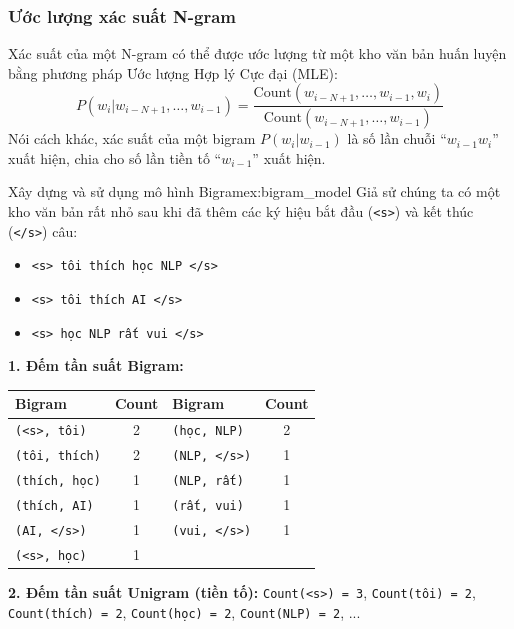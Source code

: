 \subsubsection{Ước lượng xác suất N-gram}
Xác suất của một N-gram có thể được ước lượng từ một kho văn bản huấn luyện bằng phương pháp Ước lượng Hợp lý Cực đại (MLE):
$$ P(w_i | w_{i-N+1}, \dots, w_{i-1}) = \frac{\text{Count}(w_{i-N+1}, \dots, w_{i-1}, w_i)}{\text{Count}(w_{i-N+1}, \dots, w_{i-1})} $$
Nói cách khác, xác suất của một bigram $P(w_i|w_{i-1})$ là số lần chuỗi “$w_{i-1} w_i$” xuất hiện, chia cho số lần tiền tố “$w_{i-1}$” xuất hiện.

\begin{example}{Xây dựng và sử dụng mô hình Bigram}{ex:bigram_model}
    Giả sử chúng ta có một kho văn bản rất nhỏ sau khi đã thêm các ký hiệu bắt đầu (\texttt{<s>}) và kết thúc (\texttt{</s>}) câu:
    \begin{itemize}
        \item \texttt{<s> tôi thích học NLP </s>}
        \item \texttt{<s> tôi thích AI </s>}
        \item \texttt{<s> học NLP rất vui </s>}
    \end{itemize}

    \textbf{1. Đếm tần suất Bigram:}
    \begin{center}
    \begin{tabular}{|l|c||l|c|}
        \hline
        \textbf{Bigram} & \textbf{Count} & \textbf{Bigram} & \textbf{Count} \\
        \hline
        \texttt{(<s>, tôi)} & 2 & \texttt{(học, NLP)} & 2 \\
        \texttt{(tôi, thích)} & 2 & \texttt{(NLP, </s>)} & 1 \\
        \texttt{(thích, học)} & 1 & \texttt{(NLP, rất)} & 1 \\
        \texttt{(thích, AI)} & 1 & \texttt{(rất, vui)} & 1 \\
        \texttt{(AI, </s>)} & 1 & \texttt{(vui, </s>)} & 1 \\
        \texttt{(<s>, học)} & 1 & & \\
        \hline
    \end{tabular}
    \end{center}

    \textbf{2. Đếm tần suất Unigram (tiền tố):}
    \texttt{Count(<s>) = 3}, \texttt{Count(tôi) = 2}, \texttt{Count(thích) = 2}, \texttt{Count(học) = 2}, \texttt{Count(NLP) = 2}, ...


\end{example}
